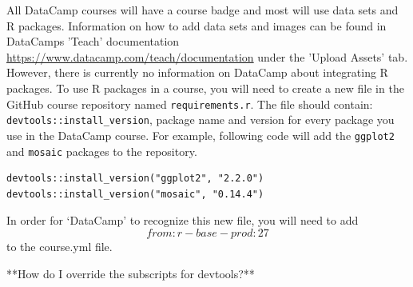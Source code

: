 \documentclass[12pt]{article}
\begin{document}
All DataCamp courses will have a course badge and most will use data sets and R packages. Information on how to add data sets and images
can be found in DataCamps 'Teach' documentation \url{https://www.datacamp.com/teach/documentation} under the 'Upload Assets' tab. However,
there is currently no information on DataCamp about integrating R packages. To use R packages in a course, you will need to create a new file
in the GitHub course repository named \texttt{requirements.r}. The file should contain: \texttt{devtools::install\_version}, package name and version for every
package you use in the DataCamp course. For example, following code will add the \texttt{ggplot2} and \texttt{mosaic} packages to the repository.

\begin{verbatim}
devtools::install_version("ggplot2", "2.2.0")
devtools::install_version("mosaic", "0.14.4")
\end{verbatim}
In order for `DataCamp' to recognize this new file, you will need to add $$from: r-base-prod:27$$ to the course.yml file.

**How do I override the subscripts for devtools?**






%


\end{document}

